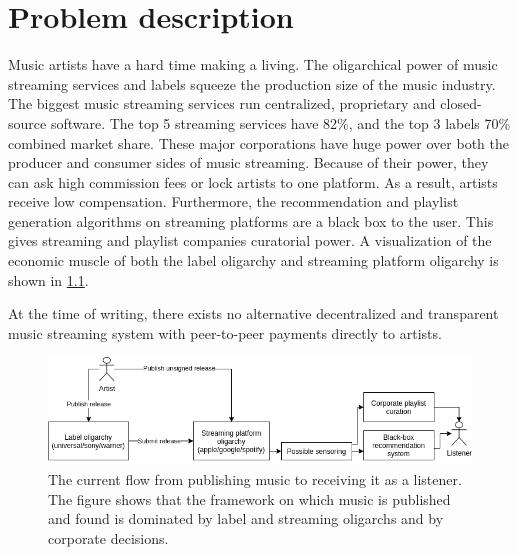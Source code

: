 \chapter{\label{chap:related-work}Problem description}
Music artists have a hard time making a living. The oligarchical power of music streaming services and labels squeeze the production size of the music industry. The biggest music streaming services run centralized, proprietary and closed-source software. The top 5 streaming services have 82\%, and the top 3 labels 70\% combined market share. These major corporations have huge power over both the producer and consumer sides of music streaming. Because of their power, they can ask high commission fees or lock artists to one platform. As a result, artists receive low compensation. Furthermore, the recommendation and playlist generation algorithms on streaming platforms are a black box to the user. This gives streaming and playlist companies curatorial power. A visualization of the economic muscle of both the label oligarchy and streaming platform oligarchy is shown in \ref{fig:current-music-publishing-situation}.

At the time of writing, there exists no alternative decentralized and transparent music streaming system with peer-to-peer payments directly to artists. 

\begin{figure}
    \centering
    \includegraphics[width=1\linewidth]{problem-description/current-music-publishing-situation.png}
    \caption{The current flow from publishing music to receiving it as a listener. The figure shows that the framework on which music is published and found is dominated by label and streaming oligarchs and by corporate decisions.}
    \label{fig:current-music-publishing-situation}
\end{figure}

